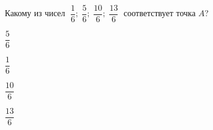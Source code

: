 \begin{ex}
	\begin{condition}
		Какому из чисел \( \;\dfrac{1}{6};\;\dfrac{5}{6};\;\dfrac{10}{6};\;\dfrac{13}{6}\; \) соответствует точка $A$?
		
		\selectanswer
		\begin{enumcols}[columns=4]
			\item $\dfrac{5}{6}$
			\item $\dfrac{1}{6}$
			\item $\dfrac{10}{6}$
			\item $\dfrac{13}{6}$
		\end{enumcols}
	\end{condition}
\end{ex}